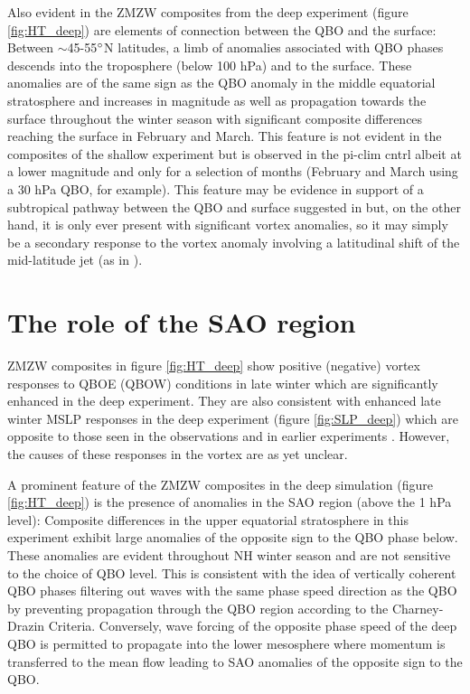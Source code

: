 Also evident in the ZMZW composites from the deep experiment (figure \ref{fig:HT_deep}) are elements of connection between the QBO and the surface: Between $\sim$45-55$\degree$N latitudes, a limb of anomalies associated with QBO phases descends into the troposphere (below 100 hPa) and to the surface. These anomalies are of the same sign as the QBO anomaly in the middle equatorial stratosphere and increases in magnitude as well as propagation towards the surface throughout the winter season with significant composite differences reaching the surface in February and March. This feature is not evident in the composites of the shallow experiment but is observed in the pi-clim cntrl albeit at a lower magnitude and only for a selection of months (February and March using a 30 hPa QBO, for example). This feature may be evidence in support of a subtropical pathway between the QBO and surface suggested in \cite{graySurface2018b} but, on the other hand, it is only ever present with significant vortex anomalies, so it may simply be a secondary response to the vortex anomaly involving a latitudinal shift of the mid-latitude jet (as in \cite{baldwinStratospheric2001a}). 

\section{The role of the SAO region}
\label{sec:role_SAO}

ZMZW composites in figure \ref{fig:HT_deep} show positive (negative) vortex responses to QBOE (QBOW) conditions in late winter which are significantly enhanced in the deep experiment. They are also consistent with enhanced late winter MSLP responses in the deep experiment (figure \ref{fig:SLP_deep}) which are opposite to those seen in the observations \citep{graySurface2018b} and in earlier experiments \citep{andrewsObserved2019d}. However, the causes of these responses in the vortex are as yet unclear. 

A prominent feature of the ZMZW composites in the deep simulation (figure \ref{fig:HT_deep}) is the presence of anomalies in the SAO region (above the 1 hPa level): Composite differences in the upper equatorial stratosphere in this experiment exhibit large anomalies of the opposite sign to the QBO phase below. These anomalies are evident throughout NH winter season and are not sensitive to the choice of QBO level. This is consistent with the idea of vertically coherent QBO phases filtering out waves with the same phase speed direction as the QBO by preventing propagation through the QBO region according to the Charney-Drazin Criteria. Conversely, wave forcing of the opposite phase speed of the deep QBO is permitted to propagate into the lower mesosphere where momentum is transferred to the mean flow leading to SAO anomalies of the opposite sign to the QBO. 

